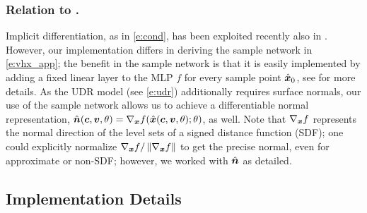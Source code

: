 \documentclass[runningheads]{llncs}
\begin{document}
\subsubsection*{Relation to \cite{niemeyer2019differentiable}.}
Implicit differentiation, as in \eqref{e:cond}, has been exploited recently also in \cite{niemeyer2019differentiable}. However, our implementation differs in deriving the sample network in \eqref{e:vhx_app}; the benefit in the sample network is that it is easily implemented by adding a fixed linear layer to the MLP $f$ for every sample point ${\hat{\bm{x}}}_0$, see \cite{atzmon2019controlling} for more details. As the UDR model (see \eqref{e:udr}) additionally requires surface normals, our use of the sample network allows us to achieve a differentiable normal representation, ${\hat{\bm{n}}}({\bm{c}},{\bm{v}},\theta)=\nabla_{\bm{x}} f( {\hat{\bm{x}}}({\bm{c}},{\bm{v}},\theta) ; \theta )$, as well. Note that $\nabla_{\bm{x}} f$ represents the normal direction of the level sets of a signed distance function (SDF); one could explicitly normalize $\nabla_{\bm{x}} f / \left\Vert\nabla_{\bm{x}} f\right\Vert$ to get the precise normal, even for approximate or non-SDF; however, we worked with ${\hat{\bm{n}}}$ as detailed. 

\subsection{Implementation Details}
\end{document}
